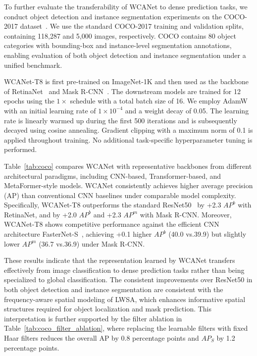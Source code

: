 \documentclass[a4paper,fleqn]{cas-dc}
\begin{document}
{\color{blue}
To further evaluate the transferability of WCANet to dense prediction tasks,
we conduct object detection and instance segmentation experiments on the
COCO-2017 dataset~\cite{lin2014microsoft}.
We use the standard COCO-2017 training and validation splits, containing
118,287 and 5,000 images, respectively. COCO contains 80 object categories
with bounding-box and instance-level segmentation annotations, enabling
evaluation of both object detection and instance segmentation under a unified
benchmark.
}

WCANet-T8 is first pre-trained on ImageNet-1K and then used as the backbone
of RetinaNet~\cite{lin2017focal} and Mask R-CNN~\cite{he2017mask}.
The downstream models are trained for 12 epochs using the $1\times$ schedule
with a total batch size of 16. We employ AdamW~\cite{loshchilov2017decoupled}
with an initial learning rate of $1\times10^{-4}$ and a weight decay of 0.05.
The learning rate is linearly warmed up during the first 500 iterations and is
subsequently decayed using cosine annealing. Gradient clipping with a maximum
norm of 0.1 is applied throughout training. No additional task-specific
hyperparameter tuning is performed.

{\color{blue}
Table~\ref{tab:coco} compares WCANet with representative backbones from different architectural paradigms, including CNN-based, Transformer-based, and MetaFormer-style models.
}
WCANet consistently achieves higher average precision (AP) than conventional CNN baselines under comparable model complexity.
Specifically, WCANet-T8 outperforms the standard ResNet50~\cite{he2016deep} by +2.3 $AP^b$ with RetinaNet, and by +2.0 $AP^b$ and +2.3 $AP^m$ with Mask R-CNN.
Moreover, WCANet-T8 shows competitive performance against the efficient CNN architecture FasterNet-S~\cite{chen2023run}, achieving +0.1 higher $AP^b$ (40.0 vs.39.9) but slightly lower $AP^m$ (36.7 vs.36.9) under Mask R-CNN.

{\color{blue}
These results indicate that the representation learned by WCANet transfers effectively from image classification to dense prediction tasks rather than being specialized to global classification. The consistent improvements over ResNet50 in both object detection and instance segmentation are consistent with the frequency-aware spatial modeling of LWSA, which enhances informative spatial structures required for object localization and mask prediction. This interpretation is further supported by the filter ablation in Table~\ref{tab:coco_filter_ablation}, where replacing the learnable filters with fixed Haar filters reduces the overall AP by 0.8 percentage points and $AP_S$ by 1.2 percentage points.
}
\end{document}
